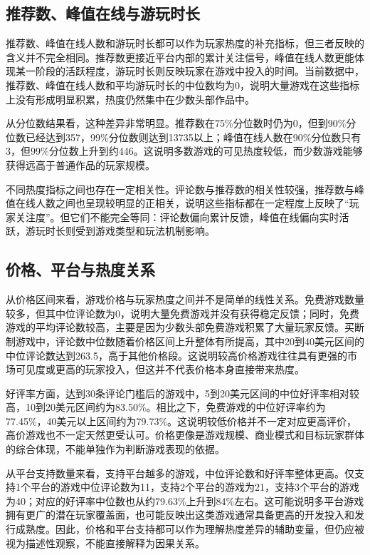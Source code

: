 \documentclass[UTF8,a4paper,12pt,fontset=fandol]{ctexart}
\begin{document}
\subsection{推荐数、峰值在线与游玩时长}
推荐数、峰值在线人数和游玩时长都可以作为玩家热度的补充指标，但三者反映的含义并不完全相同。推荐数更接近平台内部的累计关注信号，峰值在线人数更能体现某一阶段的活跃程度，游玩时长则反映玩家在游戏中投入的时间。当前数据中，推荐数、峰值在线人数和平均游玩时长的中位数均为0，说明大量游戏在这些指标上没有形成明显积累，热度仍然集中在少数头部作品中。

从分位数结果看，这种差异非常明显。推荐数在75\%分位数时仍为0，但到90\%分位数已经达到357，99\%分位数则达到13735以上；峰值在线人数在90\%分位数只有3，但99\%分位数上升到约446。这说明多数游戏的可见热度较低，而少数游戏能够获得远高于普通作品的玩家规模。

不同热度指标之间也存在一定相关性。评论数与推荐数的相关性较强，推荐数与峰值在线人数之间也呈现较明显的正相关，说明这些指标都在一定程度上反映了“玩家关注度”。但它们不能完全等同：评论数偏向累计反馈，峰值在线偏向实时活跃，游玩时长则受到游戏类型和玩法机制影响。

\subsection{价格、平台与热度关系}
从价格区间来看，游戏价格与玩家热度之间并不是简单的线性关系。免费游戏数量较多，但其中位评论数为0，说明大量免费游戏并没有获得稳定反馈；同时，免费游戏的平均评论数较高，主要是因为少数头部免费游戏积累了大量玩家反馈。买断制游戏中，评论数中位数随着价格区间上升整体有所提高，其中20到40美元区间的中位评论数达到263.5，高于其他价格段。这说明较高价格游戏往往具有更强的市场可见度或更高的玩家投入，但这并不代表价格本身直接带来热度。

好评率方面，达到30条评论门槛后的游戏中，5到20美元区间的中位好评率相对较高，10到20美元区间约为83.50\%。相比之下，免费游戏的中位好评率约为77.45\%，40美元以上区间约为79.73\%。这说明较低价格并不一定对应更高评价，高价游戏也不一定天然更受认可。价格更像是游戏规模、商业模式和目标玩家群体的综合体现，不能单独作为判断游戏表现的依据。

从平台支持数量来看，支持平台越多的游戏，中位评论数和好评率整体更高。仅支持1个平台的游戏中位评论数为11，支持2个平台的游戏为21，支持3个平台的游戏为40；对应的好评率中位数也从约79.63\%上升到84\%左右。这可能说明多平台游戏拥有更广的潜在玩家覆盖面，也可能反映出这类游戏通常具备更高的开发投入和发行成熟度。因此，价格和平台支持都可以作为理解热度差异的辅助变量，但仍应被视为描述性观察，不能直接解释为因果关系。
\end{document}
